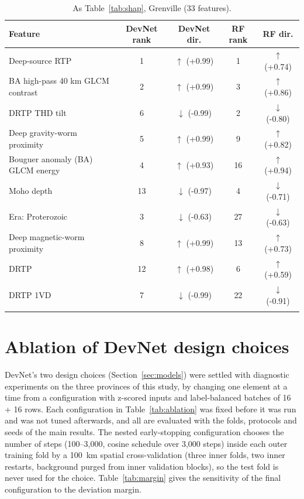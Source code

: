 \documentclass[pdflatex,sn-apa]{sn-jnl}
\begin{document}
\begin{appendices}
\begin{table}[!h]
\caption{As Table~\ref{tab:shap}, Grenville (33 features).}\label{tab:shap-gren}
\footnotesize
\begin{tabular*}{\textwidth}{@{\extracolsep\fill}lcccc}
\toprule
Feature & DevNet rank & DevNet dir. & RF rank & RF dir. \\
\midrule
Deep-source RTP & 1 & $\uparrow$ (+0.99) & 1 & $\uparrow$ (+0.74) \\
BA high-pass 40 km GLCM contrast & 2 & $\uparrow$ (+0.99) & 3 & $\uparrow$ (+0.86) \\
DRTP THD tilt & 6 & $\downarrow$ (-0.99) & 2 & $\downarrow$ (-0.80) \\
Deep gravity-worm proximity & 5 & $\uparrow$ (+0.99) & 9 & $\uparrow$ (+0.82) \\
Bouguer anomaly (BA) GLCM energy & 4 & $\uparrow$ (+0.93) & 16 & $\uparrow$ (+0.94) \\
Moho depth & 13 & $\downarrow$ (-0.97) & 4 & $\downarrow$ (-0.71) \\
Era: Proterozoic & 3 & $\downarrow$ (-0.63) & 27 & $\downarrow$ (-0.63) \\
Deep magnetic-worm proximity & 8 & $\uparrow$ (+0.99) & 13 & $\uparrow$ (+0.73) \\
DRTP & 12 & $\uparrow$ (+0.98) & 6 & $\uparrow$ (+0.59) \\
DRTP 1VD & 7 & $\downarrow$ (-0.99) & 22 & $\downarrow$ (-0.91) \\
\botrule
\end{tabular*}
\end{table}

\section{Ablation of DevNet design choices}\label{app:sensitivity}

DevNet's two design choices (Section~\ref{sec:models}) were settled with diagnostic experiments on the three provinces of this study, by changing one element at a time from a configuration with z-scored inputs and label-balanced batches of 16 + 16 rows. Each configuration in Table~\ref{tab:ablation} was fixed before it was run and was not tuned afterwards, and all are evaluated with the folds, protocols and seeds of the main results. The nested early-stopping configuration chooses the number of steps (100--3,000, cosine schedule over 3,000 steps) inside each outer training fold by a 100~km spatial cross-validation (three inner folds, two inner restarts, background purged from inner validation blocks), so the test fold is never used for the choice. Table~\ref{tab:margin} gives the sensitivity of the final configuration to the deviation margin.


\end{appendices}
\end{document}
